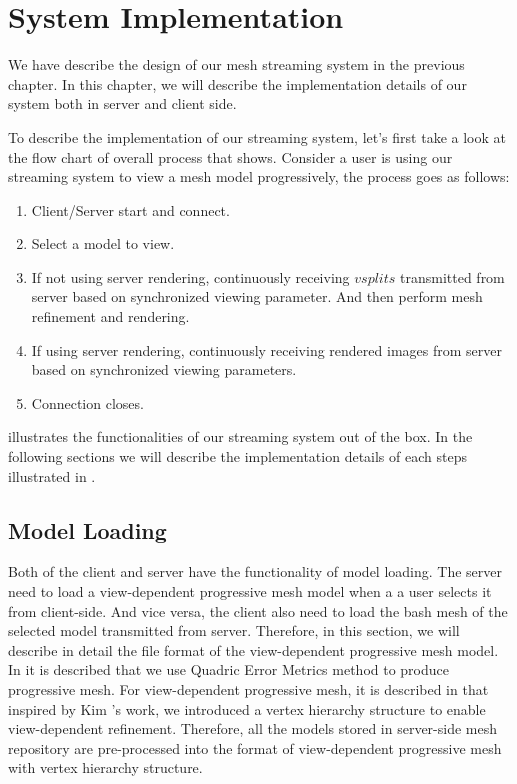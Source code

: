 \chapter{System Implementation}
\label{chapter:SystemImplementation}
We have describe the design of our mesh streaming system in the previous chapter. In this chapter, we will describe the implementation details of our system both in server and client side. 

To describe the implementation of our streaming system, let's first take a look at the flow chart of overall process that  shows. Consider a user is using our streaming system to view a mesh model progressively, the process goes as follows: 
\begin{enumerate}
\item
Client/Server start and connect. 
\item
Select a model to view.
\item
If not using server rendering, continuously receiving $vsplits$ transmitted from server based on synchronized viewing parameter. And then perform mesh refinement and rendering.
\item
If using server rendering, continuously receiving rendered images from server based on synchronized viewing parameters.
\item
Connection closes.
\end{enumerate}
 illustrates the functionalities of our streaming system out of the box. In the following sections we will describe the implementation details of each steps illustrated in . 

\section{Model Loading}
\label{section:modelloading}
Both of the client and server have the functionality of model loading. The server need to load a view-dependent progressive mesh model when a a user selects it from client-side. And vice versa, the client also need to load the bash mesh of the selected model transmitted from server. Therefore, in this section, we will describe in detail the file format of the view-dependent progressive mesh model. \\


In  it is described that we use Quadric Error Metrics method to produce progressive mesh. For view-dependent progressive mesh, it is described in  that inspired by Kim \etal's\cite{Kim:2003:TransitiveMeshSpace} work, we introduced a vertex hierarchy structure to enable view-dependent refinement. Therefore, all the models stored in server-side mesh repository are pre-processed into the format of view-dependent progressive mesh with vertex hierarchy structure. \\

